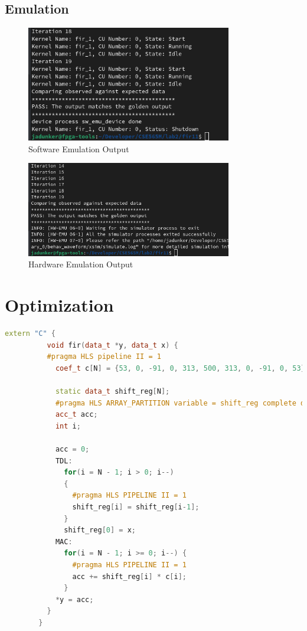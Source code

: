 \documentclass[11pt]{article}
\begin{document}
      \subsection{Emulation}
      \begin{figure}[H]
        \centering
        \includegraphics[width=0.8\textwidth]{baseline_sw_emu.png}
        \caption{Software Emulation Output}
        \label{fig:bl_sw_emu_out}
      \end{figure}
      \begin{figure}[H]
        \centering
        \includegraphics[width=0.8\textwidth]{baseline_hw_emu_2.png}
        \caption{Hardware Emulation Output}
        \label{fig:bl_hw_emu_out}
      \end{figure}
    
    \pagebreak[3]
    \section{Optimization}
      \begin{lstlisting}[style=HLSstyle, language=C++]
        extern "C" {
          void fir(data_t *y, data_t x) {
          #pragma HLS pipeline II = 1
            coef_t c[N] = {53, 0, -91, 0, 313, 500, 313, 0, -91, 0, 53};

            static data_t shift_reg[N];
            #pragma HLS ARRAY_PARTITION variable = shift_reg complete dim = 0
            acc_t acc;
            int i;

            acc = 0;
            TDL:
              for(i = N - 1; i > 0; i--)
              {
                #pragma HLS PIPELINE II = 1
                shift_reg[i] = shift_reg[i-1];
              }
              shift_reg[0] = x;
            MAC:
              for(i = N - 1; i >= 0; i--) {
                #pragma HLS PIPELINE II = 1
                acc += shift_reg[i] * c[i];
              }
            *y = acc;
          }
        }
      \end{lstlisting}
      \pagebreak[3]
\end{document}

